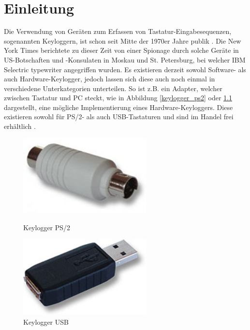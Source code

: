 \chapter{Einleitung}
Die Verwendung von Geräten zum Erfassen von Tastatur-Eingabesequenzen, sogenannten Keyloggern, ist schon seit Mitte der 1970er Jahre publik \cite{engelberg}. Die New York Times berichtete zu dieser Zeit von einer Spionage durch solche Geräte in US-Botschaften und -Konsulaten in Moskau und St. Petersburg, bei welcher IBM Selectric typewriter angegriffen wurden. Es existieren derzeit sowohl Software- als auch Hardware-Keylogger, jedoch lassen sich diese auch noch einmal in verschiedene Unterkategorien unterteilen. So ist z.B. ein Adapter, welcher zwischen Tastatur und PC steckt, wie in Abbildung \ref{keylogger_ps2} \cite{keylogger_ps2} oder \ref{keylogger_usb} \cite{keylogger_usb} dargestellt, eine mögliche Implementierung eines Hardware-Keyloggers. Diese existieren sowohl für PS/2- als auch USB-Tastaturen und sind im Handel frei erhältlich \cite{keelog}.
\begin{figure}
  \centering
  \begin{minipage}{0.45\textwidth}
    \centering
    \includegraphics[width=0.6\textwidth]{images/keylogger_ps2.jpg}
    \caption{Keylogger PS/2}
    \label{keylogger_ps2}
  \end{minipage}
  \begin{minipage}{0.45\textwidth}
    \centering
    \includegraphics[width=0.6\textwidth]{images/keylogger_usb.jpg}
    \caption{Keylogger USB}
    \label{keylogger_usb}
  \end{minipage}
\end{figure}

